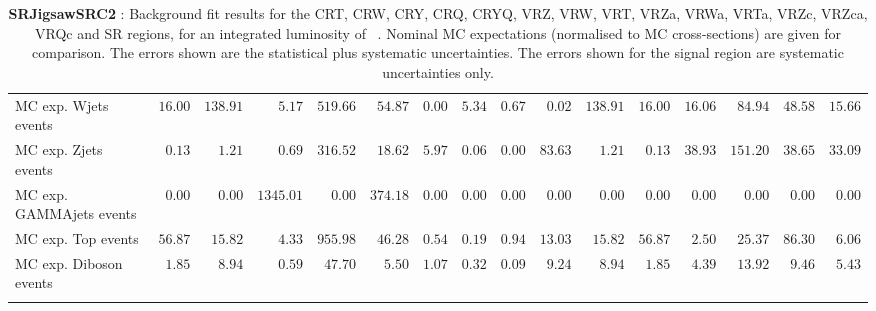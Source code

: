 \begin{table}
{\begin{tabular*}{\textwidth}{@{\extracolsep{\fill}}lrrrrrrrrrrrrrrr}
        MC exp. Wjets events         & $16.00$          & $138.91$          & $5.17$          & $519.66$          & $54.87$          & $0.00$          & $5.34$          & $0.67$          & $0.02$          & $138.91$          & $16.00$          & $16.06$          & $84.94$          & $48.58$          & $15.66$              \\
        MC exp. Zjets events         & $0.13$          & $1.21$          & $0.69$          & $316.52$          & $18.62$          & $5.97$          & $0.06$          & $0.00$          & $83.63$          & $1.21$          & $0.13$          & $38.93$          & $151.20$          & $38.65$          & $33.09$              \\
        MC exp. GAMMAjets events         & $0.00$          & $0.00$          & $1345.01$          & $0.00$          & $374.18$          & $0.00$          & $0.00$          & $0.00$          & $0.00$          & $0.00$          & $0.00$          & $0.00$          & $0.00$          & $0.00$          & $0.00$              \\
        MC exp. Top events         & $56.87$          & $15.82$          & $4.33$          & $955.98$          & $46.28$          & $0.54$          & $0.19$          & $0.94$          & $13.03$          & $15.82$          & $56.87$          & $2.50$          & $25.37$          & $86.30$          & $6.06$              \\
        MC exp. Diboson events         & $1.85$          & $8.94$          & $0.59$          & $47.70$          & $5.50$          & $1.07$          & $0.32$          & $0.09$          & $9.24$          & $8.94$          & $1.85$          & $4.39$          & $13.92$          & $9.46$          & $5.43$              \\
\noalign{\smallskip}\hline\noalign{\smallskip}
\end{tabular*}
}
\caption{{\bf SRJigsawSRC2} : Background fit results for the CRT, CRW, CRY, CRQ, CRYQ, VRZ, VRW, VRT, VRZa, VRWa, VRTa, VRZc, VRZca, VRQc and SR regions, for an integrated luminosity of \ourintlumi~\ifb. Nominal MC expectations (normalised to MC cross-sections) are given for comparison. The errors shown are the statistical plus systematic uncertainties. The errors shown for the signal region are systematic uncertainties only.}
\label{table.results.systematics.in.logL.fit.CRT.CRW.CRY.CRQ.CRYQ.VRZ.VRW.VRT.VRZa.VRWa.VRTa.VRZc.VRZca.VRQc.SR.SRJigsawSRC2}
\end{table}
%